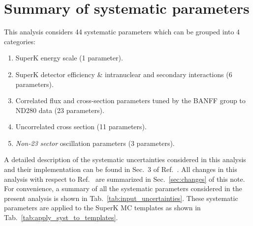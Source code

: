 \section {Summary of systematic parameters }
\label{sec:systematics}

This analysis considers 44 systematic parameters which can be grouped into 4 categories:
\begin{enumerate}
\item SuperK energy scale (1 parameter).
\item SuperK detector efficiency \& intranuclear and secondary interactions (6 parameters).
\item Correlated flux and cross-section parameters tuned by the BANFF group to ND280 data (23 parameters).
\item Uncorrelated cross section (11 parameters).
\item \emph{Non-23 sector} oscillation parameters (3 parameters).
\end{enumerate}
A detailed description of the systematic uncertainties considered in this analysis and their
implementation can be found in Sec.\ 3 of  Ref.\ \cite{OurRun123DisappAnalysis3Flavour}.
All changes in this analysis with respect to Ref.\ \cite{OurRun123DisappAnalysis3Flavour}
are summarized in Sec.\ \ref{sec:changes} of this note.
For convenience, a summary of all the systematic parameters considered in the present
analysis is shown in Tab.\ \ref{tab:input_uncertainties}.
These systematic parameters are applied to the SuperK MC templates as 
shown in Tab.\ \ref{tab:apply_syst_to_templates}.

